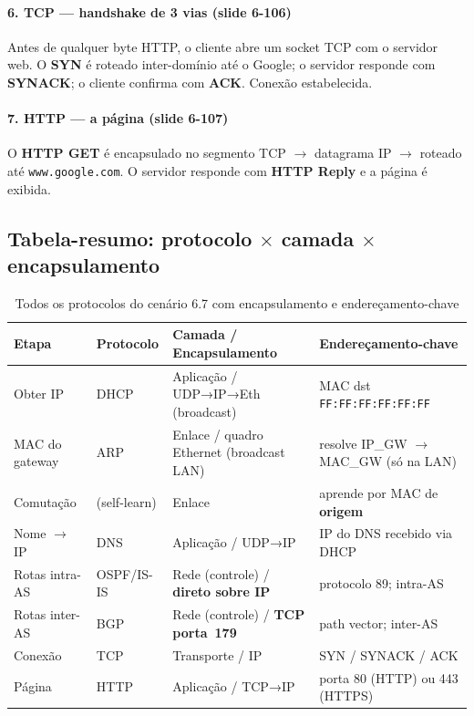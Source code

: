 \documentclass[11pt,a4paper]{article}
\begin{document}
\paragraph{6. TCP --- handshake de 3 vias (slide 6-106)}

Antes de qualquer byte HTTP, o cliente abre um socket TCP com o servidor web. O \textbf{SYN} é roteado inter-domínio até o Google; o servidor responde com \textbf{SYNACK}; o cliente confirma com \textbf{ACK}. Conexão estabelecida.

\paragraph{7. HTTP --- a página (slide 6-107)}

O \textbf{HTTP GET} é encapsulado no segmento TCP $\to$ datagrama IP $\to$ roteado até \texttt{www.google.com}. O servidor responde com \textbf{HTTP Reply} e a página é exibida.

\subsection{Tabela-resumo: protocolo $\times$ camada $\times$ encapsulamento}

\begin{table}[h!]
\centering
\caption{Todos os protocolos do cenário 6.7 com encapsulamento e endereçamento-chave}
\label{tab:resumo67}
\begin{tabularx}{\textwidth}{lXXX}
\toprule
\textbf{Etapa} & \textbf{Protocolo} & \textbf{Camada / Encapsulamento} & \textbf{Endereçamento-chave} \\
\midrule
Obter IP         & DHCP         & Aplicação / UDP→IP→Eth (broadcast)         & MAC dst \texttt{FF:FF:FF:FF:FF:FF} \\
MAC do gateway   & ARP          & Enlace / quadro Ethernet (broadcast LAN)   & resolve IP\_GW $\to$ MAC\_GW (só na LAN) \\
Comutação        & (self-learn) & Enlace                                      & aprende por MAC de \textbf{origem} \\
Nome $\to$ IP    & DNS          & Aplicação / UDP→IP                          & IP do DNS recebido via DHCP \\
Rotas intra-AS   & OSPF/IS-IS   & Rede (controle) / \textbf{direto sobre IP} & protocolo 89; intra-AS \\
Rotas inter-AS   & BGP          & Rede (controle) / \textbf{TCP porta~179}   & path vector; inter-AS \\
Conexão          & TCP          & Transporte / IP                             & SYN / SYNACK / ACK \\
Página           & HTTP         & Aplicação / TCP→IP                          & porta 80 (HTTP) ou 443 (HTTPS) \\
\bottomrule
\end{tabularx}
\end{table}
\end{document}
